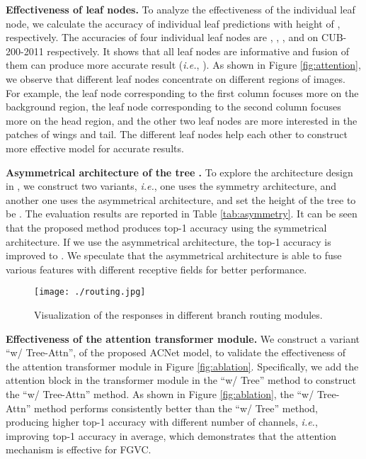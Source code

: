 \documentclass[10pt,twocolumn,letterpaper]{article}
\def\ie{{\em i.e.}}
\begin{document}
{\flushleft \textbf{Effectiveness of leaf nodes.}} To analyze the effectiveness of the individual leaf node, we calculate the accuracy of individual leaf predictions with height of , respectively. The accuracies of four individual leaf nodes are , , , and  on CUB-200-2011 respectively. It shows that all leaf nodes are informative and fusion of them can produce more accurate result (\ie, ). As shown in Figure \ref{fig:attention}, we observe that different leaf nodes concentrate on different regions of images. For example, the leaf node corresponding to the first column focuses more on the background region, the leaf node corresponding to the second column focuses more on the head region, and the other two leaf nodes are more interested in the patches of wings and tail. The different leaf nodes help each other to construct more effective model for accurate results. 

{\flushleft \textbf{Asymmetrical architecture of the tree .}}
To explore the architecture design in , we construct two variants, \ie, one uses the symmetry architecture, and another one uses the asymmetrical architecture, and set the height of the tree  to be . The evaluation results are reported in Table \ref{tab:asymmetry}. It can be seen that the proposed method produces  top-1 accuracy using the symmetrical architecture. If we use the asymmetrical architecture, the top-1 accuracy is improved  to . We speculate that the asymmetrical architecture is able to fuse various features with different receptive fields for better performance. 

\begin{figure}[t]
\centering
\texttt{[image: ./routing.jpg]}
\caption{Visualization of the responses in different branch routing modules.}
\vspace{-2mm}
\label{fig:routing}
\end{figure}

{\flushleft \textbf{Effectiveness of the attention transformer module.}} We construct a variant ``w/ Tree-Attn'', of the proposed ACNet model, to validate the effectiveness of the attention transformer module in Figure \ref{fig:ablation}. Specifically, we add the attention block in the transformer module in the ``w/ Tree'' method to construct the ``w/ Tree-Attn'' method. As shown in Figure \ref{fig:ablation}, the ``w/ Tree-Attn'' method performs consistently better than the ``w/ Tree'' method, producing higher top-1 accuracy with different number of channels, \ie, improving  top-1 accuracy in average, which demonstrates that the attention mechanism is effective for FGVC. 
\end{document}

